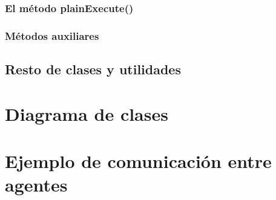 \subsubsection{El método plainExecute()}

\subsubsection{Métodos auxiliares}

\subsection{Resto de clases y utilidades}

\section{Diagrama de clases}

\section{Ejemplo de comunicación entre agentes}